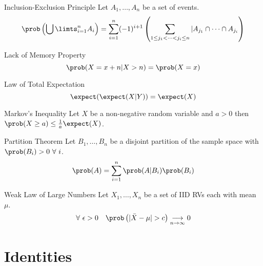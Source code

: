 \documentclass[11pt,a4paper]{article}
\begin{document}
\begin{theorem}{Inclusion-Exclusion Principle}
Let $A_1,\dots,A_n$ be a set of events.
\[ \prob\left(\bigcup\limts_{i=1}^nA_i\right)=\sum_{i=1}^n(-1)^{i+1}\left(\sum_{1\leq j_1<\dots<j_i\leq n}|A_{j_1}\cap\dots\cap A_{j_i}\right) \]
\end{theorem}

\begin{theorem}{Lack of Memory Property}
\[ \prob(X=x+n|X>n)=\prob(X=x) \]
\end{theorem}

\begin{theorem}{Law of Total Expectation}
\[ \expect(\expect(X|Y))=\expect(X) \]
\end{theorem}

\begin{theorem}{Markov's Inequality}
  Let $X$ be a non-negative random variable and $a>0$ then $\prob(X\geq a)\leq\frac1a\expect(X)$.
\end{theorem}

\begin{theorem}{Partition Theorem}
Let $B_1,\dots,B_n$ be a disjoint partition of the sample space with $\prob(B_i)>0\ \forall\ i$.
\[ \prob(A)=\sum_{i=1}^n\prob(A|B_i)\prob(B_i) \]
\end{theorem}

\begin{theorem}{Weak Law of Large Numbers}
Let $X_1,\dots,X_n$ be a set of IID RVs each with mean $\mu$.
\[ \forall\ \epsilon>0\quad \prob\left(|\bar{X}-\mu|>c\right)\underset{n\to\infty}\longrightarrow0 \]
\end{theorem}

\section{Identities}
\end{document}
